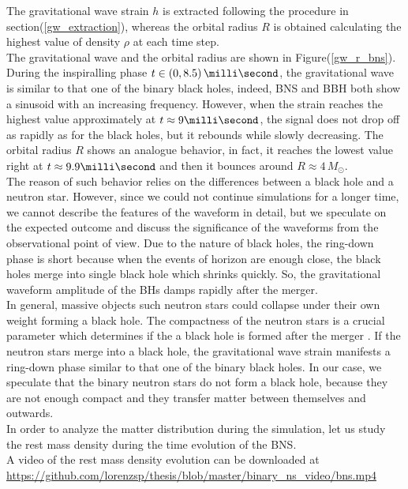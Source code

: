 The gravitational wave strain $h$ is extracted following the procedure in section(\ref{gw_extraction}), whereas the orbital radius $R$ is obtained calculating the highest value of density $\rho$ at each time step.\\
The gravitational wave and the orbital radius are shown in Figure(\ref{gw_r_bns}).
During the inspiralling phase $t \in (0, 8.5) \, \milli \second$, the gravitational wave is similar to that one of the binary black holes, indeed, BNS and BBH both show a sinusoid with an increasing frequency.
However, when the strain reaches the highest value approximately at $t\approx 9 \milli \second$, the signal does not drop off as rapidly as for the black holes, but it rebounds while slowly decreasing.
The orbital radius $R$ shows an analogue behavior, in fact, it reaches the lowest value right at $t \approx 9.9 \milli \second$ and then it bounces around $R \approx 4 \, M _{\odot}$.\\
The reason of such behavior relies on the differences between a black hole and a neutron star.
However, since we could not continue simulations for a longer time, we cannot describe the features of the waveform in detail, but we speculate on the expected outcome and discuss the significance of the waveforms from the observational point of view.
Due to the nature of black holes,  the ring-down phase is short because when the events of horizon are enough close, the black holes merge into single black hole which shrinks quickly.
So, the gravitational waveform amplitude of the BHs damps rapidly after the merger.\\
In general, massive objects such neutron stars could collapse under their own weight forming a black hole. The compactness of the neutron stars is a crucial parameter which determines if the a black hole is formed after the merger \cite{shibata_simulation_nodate,kiuchi_long-term_2009}.
If the neutron stars merge into a black hole, the gravitational wave strain manifests a ring-down phase similar to that one of the binary black holes.
In our case, we speculate that the binary neutron stars do not form a black hole, because they are not enough compact and they transfer matter between themselves and outwards.\\
 In order to analyze the matter distribution during the simulation, let us study the rest mass density during the time evolution of the BNS.\\
A video of the rest mass density evolution can be downloaded at \url{https://github.com/lorenzsp/thesis/blob/master/binary_ns_video/bns.mp4}

